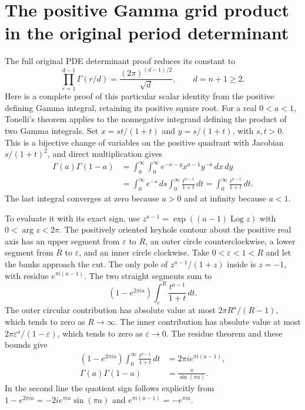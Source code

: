 \section{The positive Gamma grid product in the original period determinant}
\label{sec:PGCC}

The full original PDE determinant proof reduces its constant to
\[
 \prod_{r=1}^{d-1}\Gamma(r/d)
       =\frac{(2\pi)^{(d-1)/2}}{\sqrt d},\qquad d=n+1\geq2.
 \tag{PGCC1}
\]
Here is a complete proof of this particular scalar identity from the
positive defining Gamma integral, retaining its positive square root.
For a real $0<a<1$, Tonelli's theorem applies to the nonnegative
integrand defining the product of two Gamma integrals. Set
$x=st/(1+t)$ and $y=s/(1+t)$, with $s,t>0$. This is a bijective
change of variables on the positive quadrant with Jacobian
$s/(1+t)^2$, and direct multiplication gives
\[
 \begin{split}
 \Gamma(a)\Gamma(1-a)
 &=\int_0^\infty\int_0^\infty
        e^{-x-y}x^{a-1}y^{-a}\,dx\,dy\\
 &=\int_0^\infty e^{-s}\,ds
       \int_0^\infty\frac{t^{a-1}}{1+t}\,dt
  =\int_0^\infty\frac{t^{a-1}}{1+t}\,dt.
 \end{split}\tag{PGCC2}
\]
The last integral converges at zero because $a>0$ and at infinity
because $a<1$.

To evaluate it with its exact sign, use
$z^{a-1}=\exp((a-1)\operatorname{Log}z)$ with $0<\arg z<2\pi$.
The positively oriented keyhole contour about the positive real axis
has an upper segment from $\varepsilon$ to $R$, an outer circle
counterclockwise, a lower segment from $R$ to $\varepsilon$, and an
inner circle clockwise. Take $0<\varepsilon<1<R$ and let the banks
approach the cut. The only pole of $z^{a-1}/(1+z)$ inside is $z=-1$,
with residue $e^{\pi i(a-1)}$. The two straight segments sum to
\[
 (1-e^{2\pi ia})\int_\varepsilon^R
                       \frac{t^{a-1}}{1+t}\,dt.
 \tag{PGCC3}
\]
The outer circular contribution has absolute value at most
$2\pi R^a/(R-1)$, which tends to zero as $R\to\infty$.
The inner contribution has absolute value at most
$2\pi\varepsilon^a/(1-\varepsilon)$, which tends to zero as
$\varepsilon\to0$. The residue theorem and these bounds give
\[
 \begin{split}
 (1-e^{2\pi ia})\int_0^\infty\frac{t^{a-1}}{1+t}\,dt
 &=2\pi i e^{\pi i(a-1)},\\
 \Gamma(a)\Gamma(1-a)&=\frac{\pi}{\sin(\pi a)}.
 \end{split}\tag{PGCC4}
\]
In the second line the quotient sign follows explicitly from
$1-e^{2\pi ia}=-2i e^{\pi ia}\sin(\pi a)$ and
$e^{\pi i(a-1)}=-e^{\pi ia}$.

